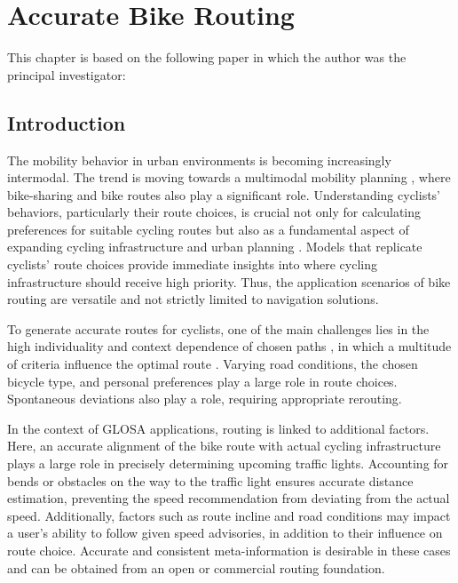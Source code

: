 \chapter{Accurate Bike Routing}\label{ch:routing}

\begin{Summary}
This chapter is based on the following paper in which the author was the principal investigator:

\cite{matthes2023accurate} 
\end{Summary}

\section{Introduction}

The mobility behavior in urban environments is becoming increasingly intermodal. The trend is moving towards a multimodal mobility planning \cite{park_framework_2023}, where bike-sharing and bike routes also play a significant role. Understanding cyclists' behaviors, particularly their route choices, is crucial not only for calculating preferences for suitable cycling routes but also as a fundamental aspect of expanding cycling infrastructure and urban planning \cite{zielstra_comparative_2011, huber_modelling_2021}. Models that replicate cyclists' route choices provide immediate insights into where cycling infrastructure should receive high priority. Thus, the application scenarios of bike routing are versatile and not strictly limited to navigation solutions.

To generate accurate routes for cyclists, one of the main challenges lies in the high individuality and context dependence of chosen paths \cite{dill_revisiting_2016, schleinitz_german_2017, misra_modeling_2018}, in which a multitude of criteria influence the optimal route \cite{song_exploring_2014}. Varying road conditions, the chosen bicycle type, and personal preferences play a large role in route choices. Spontaneous deviations also play a role, requiring appropriate rerouting.

In the context of GLOSA applications, routing is linked to additional factors. Here, an accurate alignment of the bike route with actual cycling infrastructure plays a large role in precisely determining upcoming traffic lights. Accounting for bends or obstacles on the way to the traffic light ensures accurate distance estimation, preventing the speed recommendation from deviating from the actual speed. Additionally, factors such as route incline and road conditions may impact a user's ability to follow given speed advisories, in addition to their influence on route choice. Accurate and consistent meta-information is desirable in these cases and can be obtained from an open or commercial routing foundation.

